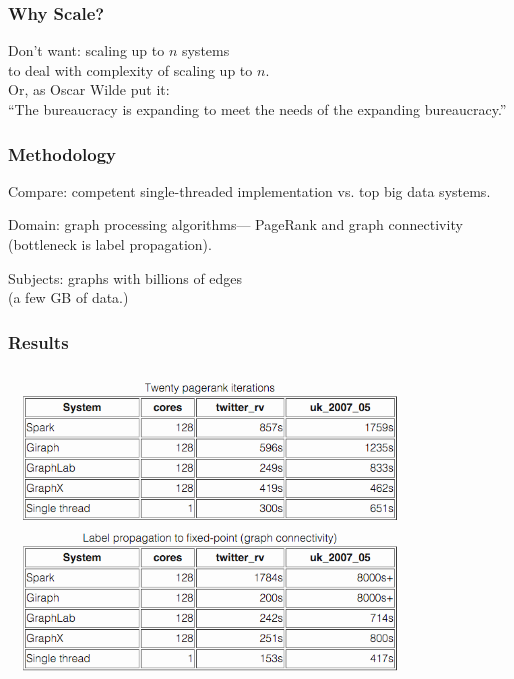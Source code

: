\begin{frame}
\frametitle{Why Scale?}

\Large
\begin{changemargin}{1cm}
Don't want: scaling up to $n$ systems \\
to deal with complexity of scaling up to $n$.\\[1em]

Or, as Oscar Wilde put it: \\
``The bureaucracy is expanding to meet the needs of the expanding bureaucracy.''
\end{changemargin}
\end{frame}



\begin{frame}
\frametitle{Methodology}

\Large
\begin{changemargin}{1cm}
Compare: competent single-threaded implementation vs. top
big data systems. 

Domain: graph processing
algorithms---
PageRank and graph connectivity \\
(bottleneck is label propagation). 

Subjects: graphs with billions of edges\\
(a few
GB of data.)
\end{changemargin}

\end{frame}



\begin{frame}
\frametitle{Results}

\begin{center}
	\includegraphics[width=0.80\textwidth]{images/pagerank.png}
\end{center}


\end{frame}



